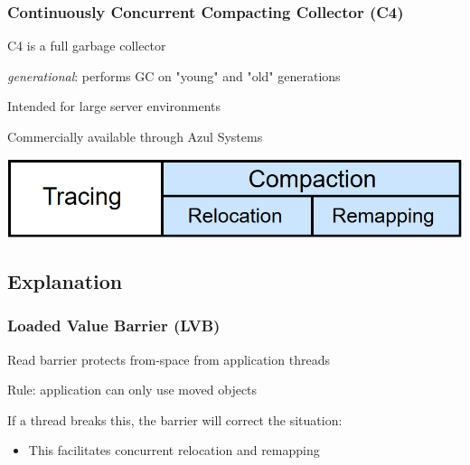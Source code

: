 \documentclass{beamer}
\newcommand{\linespace}{\vskip 0.25cm}
\begin{document}
\begin{frame}

\frametitle{Continuously Concurrent Compacting Collector (C4)}

C4 is a full garbage collector

\linespace
\linespace

\emph{generational}: performs GC on "young" and "old" generations

\linespace
\linespace

Intended for large server environments

\linespace
\linespace

Commercially available through Azul Systems

\linespace
\linespace
\linespace

\begin{center}
\includegraphics[width=.85\textwidth]{Illustrations/gc_cycle_locator_compaction.png}
\end{center}

\end{frame}



\subsection*{Explanation}

\begin{frame}

\frametitle{Loaded Value Barrier (LVB)}

Read barrier protects from-space from application threads

\linespace
\linespace

Rule: application can only use moved objects

\linespace
\linespace

If a thread breaks this, the barrier will correct the situation:
\begin{itemize}
\item This facilitates concurrent relocation and remapping
\end{itemize}

\end{frame}
\end{document}
